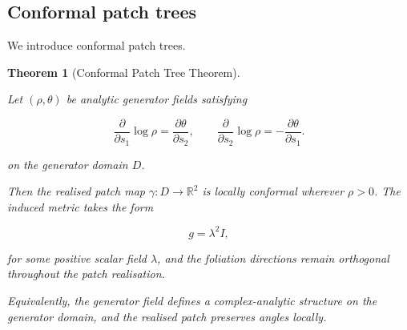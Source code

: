 \documentclass[11pt,a4paper]{article}
\newtheorem{theorem}{Theorem}[section]
\begin{document}
\subsection{Conformal patch trees}
\label{sec:conformal_general}
We introduce conformal patch trees.
\begin{theorem}[Conformal Patch Tree Theorem]
\label{thm:conformal_patch_tree}

Let $(\rho,\theta)$ be analytic generator fields satisfying

\begin{equation}
    \frac{\partial}{\partial s_1}\log\rho
    = \frac{\partial\theta}{\partial s_2},
    \qquad
    \frac{\partial}{\partial s_2}\log\rho
    = -\frac{\partial\theta}{\partial s_1}.
    \label{eq:CR_equations}
\end{equation}

on the generator domain $D$.

Then the realised patch map $\gamma:D\to\mathbb{R}^2$
is locally conformal wherever $\rho>0$.
The induced metric takes the form

\[
g=\lambda^2 I,
\]

for some positive scalar field $\lambda$, and the
foliation directions remain orthogonal throughout the
patch realisation.

Equivalently, the generator field defines a complex-analytic
structure on the generator domain, and the realised patch
preserves angles locally.
\end{theorem}
\end{document}
